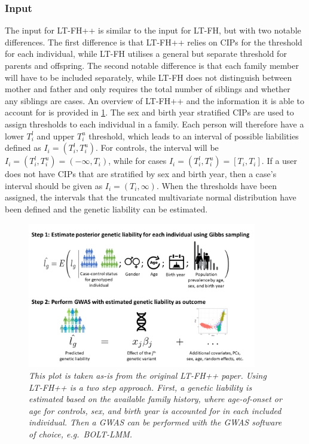 \subsubsection{Input}
The input for LT-FH++ is similar to the input for LT-FH, but with two notable differences. The first difference is that LT-FH++ relies on CIPs for the threshold for each individual, while LT-FH utilises a general but separate threshold for parents and offspring. The second notable difference is that each family member will have to be included separately, while LT-FH does not distinguish between mother and father and only requires the total number of siblings and whether any siblings are cases. An overview of LT-FH++ and the information it is able to account for is provided in \cref{fig:LTFHppFigure1}. The sex and birth year stratified CIPs are used to assign thresholds to each individual in a family. Each person will therefore have a lower $ T_i^l $ and upper $ T_i^u $ threshold, which leads to an interval of possible liabilities defined as $ I_i = (T_i^l, T_i^u) $. For controls, the interval will be $ I_i = (T_i^l,T_i^u) = (-\infty, T_i) $, while for cases $ I_i = (T_i^l,T_i^u) = [T_i,T_i] $. If a user does not have CIPs that are stratified by sex and birth year, then a case's interval should be given as $ I_i = (T_i, \infty) $. When the thresholds have been assigned, the intervals that the truncated multivariate normal distribution have been defined and the genetic liability can be estimated. 

\begin{figure}
	\includegraphics[width=10cm]{methods/ltfhpp_steps.png}
	\caption[Overview of LT-FH++ and what information it can account for in GWAS]{
		\sl This plot is taken as-is from the original LT-FH++ paper\cite{pedersen2022accounting}. Using LT-FH++ is a two step approach. First, a genetic liability is estimated based on the available family history, where age-of-onset or age for controls, sex, and birth year is accounted for in each included individual. Then a GWAS can be performed with the GWAS software of choice, e.g.\ BOLT-LMM.
	} %
	\label{fig:LTFHppFigure1}
\end{figure}


